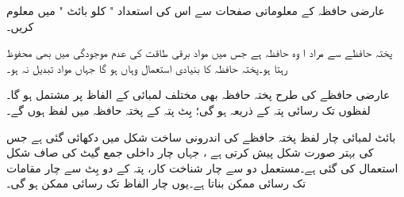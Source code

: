 عارضی حافظہ کے معلوماتی صفحات سے اس کی استعداد " کلو بائٹ " میں معلوم کریں۔



پختہ حافظے سے مراد ا وہ حافظہ ہے جس میں مواد برقی طاقت کی عدم موجودگی میں بھی محفوظ رہتا ہو۔پختہ حافظہ کا بنیادی استعمال وہاں ہو گا جہاں مواد تبدیل نہ ہو۔

عارضی حافظے کی طرح پختہ حافظہ بھی مختلف لمبائی کے الفاظ پر مشتمل ہو گا۔لفظوں تک رسائی پتہ کے ذریعہ ہو گی؛  بِٹ پتہ کے پختہ حافظہ میں  لفظ ہوں گے۔

بائٹ لمبائی چار لفظ پختہ حافظے کی اندرونی ساخت شکل    میں دکھائی گئی ہے جس کی بہتر صورت شکل   پیش کرتی ہے ، جہاں چار داخلی جمع گیٹ کی صاف شکل استعمال کی گئی ہے۔مستعمل دو سے چار شناخت کار، پتہ کے دو بِٹ سے چار مقامات تک رسائی ممکن بناتا ہے۔یوں چار الفاظ تک رسائی ممکن ہو گی۔
